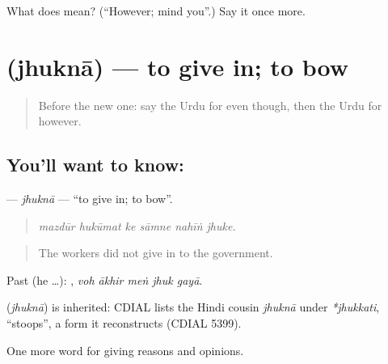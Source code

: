 \begin{tcolorbox}[breakable,colback=teal!4,colframe=teal!35!black,title={Before you move on}]
What does  mean? (\textquotedblleft{}However; mind you\textquotedblright{}.) Say it once more.
\end{tcolorbox}
\section[\texorpdfstring{\ur{جھکنا} (jhuknā)}{جھکنا (jhuknā)}]{ (jhuknā) — to give in; to bow}

\label{lesson:UR-C359-jhukna}



\begin{quote}
Before the new one: say the Urdu for even though, then the Urdu for however.
\end{quote}

\subsection*{You'll want to know: }
\textbf{} — \emph{jhuknā} — \textquotedblleft{}to give in; to bow\textquotedblright{}.

\begin{quote}
     
\end{quote}

\begin{quote}
\emph{mazdūr hukūmat ke sāmne nahīṅ jhuke.}
\end{quote}

\begin{quote}
The workers did not give in to the government.
\end{quote}

Past (he …):     , \emph{voh ākhir meṅ jhuk gayā}.

\begin{cousinweb}
\textbf{} (\emph{jhuknā}) is inherited: CDIAL lists the Hindi cousin \emph{jhuknā} under \emph{*jhukkati}, \textquotedblleft{}stoops\textquotedblright{}, a form it reconstructs (CDIAL 5399).
\end{cousinweb}

\begin{grammarlens}[title={What you've built}]
One more word for giving reasons and opinions.
\end{grammarlens}

